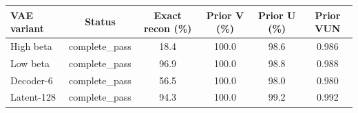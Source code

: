 \begin{tabular}{l c c c c c}
\toprule
VAE variant & Status & Exact recon (\%) & Prior V (\%) & Prior U (\%) & Prior VUN \\
\midrule
High beta & complete\_pass & 18.4 & 100.0 & 98.6 & 0.986 \\
Low beta & complete\_pass & 96.9 & 100.0 & 98.8 & 0.988 \\
Decoder-6 & complete\_pass & 56.5 & 100.0 & 98.0 & 0.980 \\
Latent-128 & complete\_pass & 94.3 & 100.0 & 99.2 & 0.992 \\
\bottomrule
\end{tabular}
